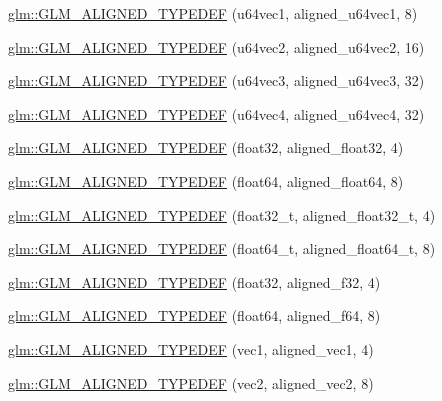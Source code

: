 \begin{DoxyCompactItemize}
\item 
\hyperlink{group__gtx__type__aligned_gab253845f534a67136f9619843cade903}{glm\-::\-G\-L\-M\-\_\-\-A\-L\-I\-G\-N\-E\-D\-\_\-\-T\-Y\-P\-E\-D\-E\-F} (u64vec1, aligned\-\_\-u64vec1, 8)
\item 
\hyperlink{group__gtx__type__aligned_ga929427a7627940cdf3304f9c050b677d}{glm\-::\-G\-L\-M\-\_\-\-A\-L\-I\-G\-N\-E\-D\-\_\-\-T\-Y\-P\-E\-D\-E\-F} (u64vec2, aligned\-\_\-u64vec2, 16)
\item 
\hyperlink{group__gtx__type__aligned_gae373b6c04fdf9879f33d63e6949c037e}{glm\-::\-G\-L\-M\-\_\-\-A\-L\-I\-G\-N\-E\-D\-\_\-\-T\-Y\-P\-E\-D\-E\-F} (u64vec3, aligned\-\_\-u64vec3, 32)
\item 
\hyperlink{group__gtx__type__aligned_ga53a8a03dca2015baec4584f45b8e9cdc}{glm\-::\-G\-L\-M\-\_\-\-A\-L\-I\-G\-N\-E\-D\-\_\-\-T\-Y\-P\-E\-D\-E\-F} (u64vec4, aligned\-\_\-u64vec4, 32)
\item 
\hyperlink{group__gtx__type__aligned_gab3301bae94ef5bf59fbdd9a24e7d2a01}{glm\-::\-G\-L\-M\-\_\-\-A\-L\-I\-G\-N\-E\-D\-\_\-\-T\-Y\-P\-E\-D\-E\-F} (float32, aligned\-\_\-float32, 4)
\item 
\hyperlink{group__gtx__type__aligned_ga75930684ff2233171c573e603f216162}{glm\-::\-G\-L\-M\-\_\-\-A\-L\-I\-G\-N\-E\-D\-\_\-\-T\-Y\-P\-E\-D\-E\-F} (float64, aligned\-\_\-float64, 8)
\item 
\hyperlink{group__gtx__type__aligned_gada9b0bea273d3ae0286f891533b9568f}{glm\-::\-G\-L\-M\-\_\-\-A\-L\-I\-G\-N\-E\-D\-\_\-\-T\-Y\-P\-E\-D\-E\-F} (float32\-\_\-t, aligned\-\_\-float32\-\_\-t, 4)
\item 
\hyperlink{group__gtx__type__aligned_ga6e3a2d83b131336219a0f4c7cbba2a48}{glm\-::\-G\-L\-M\-\_\-\-A\-L\-I\-G\-N\-E\-D\-\_\-\-T\-Y\-P\-E\-D\-E\-F} (float64\-\_\-t, aligned\-\_\-float64\-\_\-t, 8)
\item 
\hyperlink{group__gtx__type__aligned_gadbce23b9f23d77bb3884e289a574ebd5}{glm\-::\-G\-L\-M\-\_\-\-A\-L\-I\-G\-N\-E\-D\-\_\-\-T\-Y\-P\-E\-D\-E\-F} (float32, aligned\-\_\-f32, 4)
\item 
\hyperlink{group__gtx__type__aligned_gaa4deaa0dea930c393d55e7a4352b0a20}{glm\-::\-G\-L\-M\-\_\-\-A\-L\-I\-G\-N\-E\-D\-\_\-\-T\-Y\-P\-E\-D\-E\-F} (float64, aligned\-\_\-f64, 8)
\item 
\hyperlink{group__gtx__type__aligned_ga81bc497b2bfc6f80bab690c6ee28f0f9}{glm\-::\-G\-L\-M\-\_\-\-A\-L\-I\-G\-N\-E\-D\-\_\-\-T\-Y\-P\-E\-D\-E\-F} (vec1, aligned\-\_\-vec1, 4)
\item 
\hyperlink{group__gtx__type__aligned_gada3e8f783e9d4b90006695a16c39d4d4}{glm\-::\-G\-L\-M\-\_\-\-A\-L\-I\-G\-N\-E\-D\-\_\-\-T\-Y\-P\-E\-D\-E\-F} (vec2, aligned\-\_\-vec2, 8)

\end{DoxyCompactItemize}
